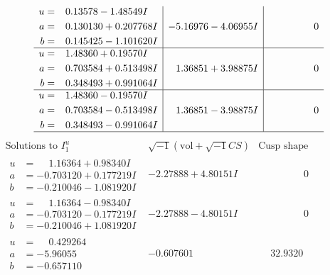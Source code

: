 \documentclass[1p]{elsarticle_modified}
\theoremstyle{definition}
\newcommand{\I}{\sqrt{-1}}
\begin{document}
$$\begin{array}{c|c|c}
\begin{aligned}
u &= \phantom{-}0.13578 - 1.48549 I \\
a &= \phantom{-}0.130130 + 0.207768 I \\
b &= \phantom{-}0.145425 - 1.101620 I\end{aligned}
 & -5.16976 - 4.06955 I & \phantom{-0.000000 } 0 \\ \hline\begin{aligned}
u &= \phantom{-}1.48360 + 0.19570 I \\
a &= \phantom{-}0.703584 + 0.513498 I \\
b &= \phantom{-}0.348493 + 0.991064 I\end{aligned}
 & \phantom{-}1.36851 + 3.98875 I & \phantom{-0.000000 } 0 \\ \hline\begin{aligned}
u &= \phantom{-}1.48360 - 0.19570 I \\
a &= \phantom{-}0.703584 - 0.513498 I \\
b &= \phantom{-}0.348493 - 0.991064 I\end{aligned}
 & \phantom{-}1.36851 - 3.98875 I & \phantom{-0.000000 } 0\\
 \hline 
 \end{array}$$\newpage$$\begin{array}{c|c|c}  
\text{Solutions to }I^u_{1}& \I (\text{vol} + \sqrt{-1}CS) & \text{Cusp shape}\\
 \hline 
\begin{aligned}
u &= \phantom{-}1.16364 + 0.98340 I \\
a &= -0.703120 + 0.177219 I \\
b &= -0.210046 - 1.081920 I\end{aligned}
 & -2.27888 + 4.80151 I & \phantom{-0.000000 } 0 \\ \hline\begin{aligned}
u &= \phantom{-}1.16364 - 0.98340 I \\
a &= -0.703120 - 0.177219 I \\
b &= -0.210046 + 1.081920 I\end{aligned}
 & -2.27888 - 4.80151 I & \phantom{-0.000000 } 0 \\ \hline\begin{aligned}
u &= \phantom{-}0.429264\phantom{ +0.000000I} \\
a &= -5.96055\phantom{ +0.000000I} \\
b &= -0.657110\phantom{ +0.000000I}\end{aligned}
 & -0.607601\phantom{ +0.000000I} & \phantom{-}32.9320\phantom{ +0.000000I} \\ \hline\begin{aligned}

\end{aligned}
\end{array}$$
\end{document}
